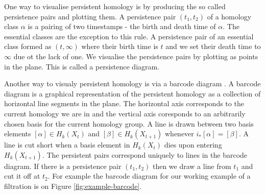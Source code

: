 
One way to visualise persistent homology is by producing the so called persistence pairs and plotting them. A persistence pair $(t_1, t_2)$ of a homology class $\alpha$ is a pairing of two timestamps - the birth and death time of $\alpha$. The essential classes are the exception to this rule. A persistence pair of an essential class formed as $(t, \infty)$ where their birth time is $t$ and we set their death time to $\infty$ due ot the lack of one. We visualise the persistence pairs by plotting as points in the plane. This is called a persistence diagram.

Another way to visualy persistent homology is via a barcode diagram \cite{barcodes}. A barcode diagram is a graphical representation of the persistent homology as a collection of horizontal line segments in the plane. The horizontal axis corresponds to the current homology we are in and the vertical axis coresponds to an arbitrarily chosen basis for the current homology group. A line is drawn between two basis elements $[\alpha] \in H_k(X_t)$ and $[\beta] \in H_k(X_{t+1})$ whenever $i_*[\alpha] = [\beta]$. A line is cut short when a basis element in $H_k(X_t)$ dies upon entering $H_k(X_{t+1})$. The persistent pairs correspond uniquely to lines in the barcode diagram. If there is a persistence pair $(t_1, t_2)$ then we draw a line from $t_1$ and cut it off at $t_2$. For example the barcode diagram for our working example of a filtration is on Figure \ref{fig:example-barcode}.


